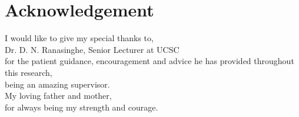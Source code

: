 \chapter*{Acknowledgement}

\begin{center}
    I would like to give my special thanks to,\\
    \vspace{0.5cm}
    Dr. D. N. Ranasinghe, Senior Lecturer at UCSC\\
    for the patient guidance, encouragement and advice he has provided throughout this research,\\
    being an amazing supervisor.\\
    \vspace{0.5cm}
    My loving father and mother,\\
    \centering
    for always being my strength and courage. 
\end{center}
